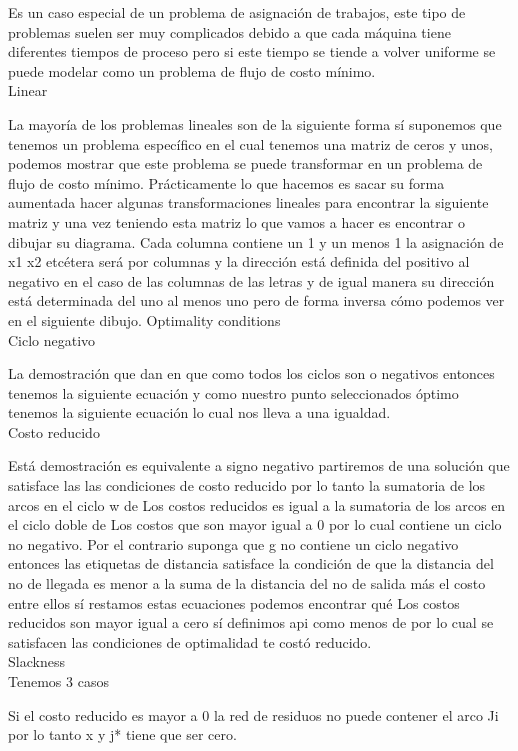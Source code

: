 \documentclass[12 pt]{report}
\begin{document}
Es un caso especial de un problema de asignación de trabajos, este tipo de problemas suelen ser muy complicados debido a que cada máquina tiene diferentes tiempos de proceso pero si este tiempo se tiende a volver uniforme se puede modelar como un problema de flujo de costo mínimo.
\\
Linear 

La mayoría de los problemas lineales son de la siguiente forma sí suponemos que tenemos un problema específico en el cual tenemos una matriz de ceros y unos, podemos mostrar que este problema se puede transformar en un problema de flujo de costo mínimo.
Prácticamente lo que hacemos es sacar su forma aumentada hacer algunas transformaciones lineales para encontrar la siguiente matriz y una vez teniendo esta matriz lo que vamos a hacer es encontrar o dibujar su diagrama.
Cada columna contiene un 1 y un menos 1 la asignación de x1 x2 etcétera será por columnas y la dirección está definida del positivo al negativo en el caso de las columnas de las letras y de igual manera su dirección está determinada del uno al menos uno pero de forma inversa cómo podemos ver en el siguiente dibujo.
Optimality conditions
\\
Ciclo negativo

La demostración que dan en que como todos los ciclos son o negativos entonces tenemos la siguiente ecuación y como nuestro punto seleccionados óptimo tenemos la siguiente ecuación lo cual nos lleva a una igualdad.
\\
Costo reducido

Está demostración es equivalente a signo negativo partiremos de una solución que satisface las las condiciones de costo reducido por lo tanto la sumatoria de los arcos en el ciclo w de Los costos reducidos es igual a la sumatoria de los arcos en el ciclo doble de Los costos que son mayor igual a 0 por lo cual contiene un ciclo no negativo.
Por el contrario suponga que g no contiene un ciclo negativo entonces las etiquetas de distancia satisface la condición de que la distancia del no de llegada es menor a la suma de la distancia del no de salida más el costo entre ellos sí restamos estas ecuaciones podemos encontrar qué Los costos reducidos son mayor igual a cero sí definimos api como menos de por lo cual se satisfacen las condiciones de optimalidad te costó reducido.\\
Slackness\\
Tenemos 3 casos

Si el costo reducido es mayor a 0 la red de residuos no puede contener el arco Ji por lo tanto x y j* tiene que ser cero.
\end{document}
